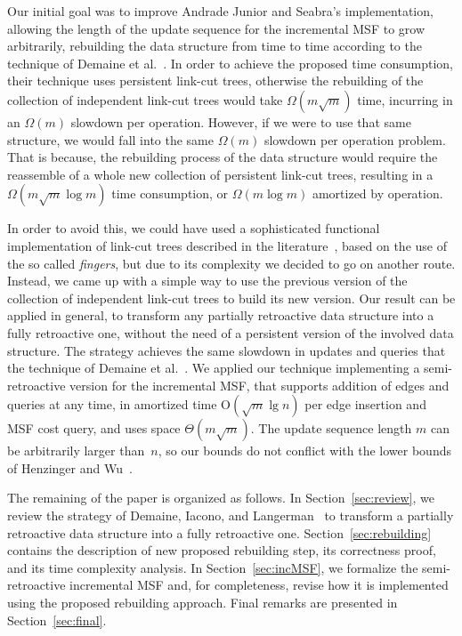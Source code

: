 \documentclass[reqno,11pt]{amsart}
\newcommand{\Oh}{\mathrm{O}}
\begin{document}
Our initial goal was to improve Andrade Junior and Seabra's implementation, allowing the length 
of the update sequence for the incremental MSF to grow arbitrarily, 
rebuilding the data structure from time to time according to the technique 
of Demaine et al.~\cite{DemaineIL2007}. In order to achieve the proposed time 
consumption, their technique uses persistent link-cut trees, otherwise the 
rebuilding of the collection of independent link-cut trees would take 
$\Omega(m \sqrt{m})$ time, incurring in an $\Omega(m)$ slowdown per operation.
However, if we were to use that same structure, we would fall into the same $\Omega(m)$
slowdown per operation problem. That is because, the rebuilding process of the data structure
would require the reassemble of a whole new collection of persistent link-cut trees, resulting 
in a $\Omega(m \sqrt{m} \log{m})$ time consumption, or $\Omega(m \log{m})$ amortized by operation.

In order to avoid this, we could have used a sophisticated functional implementation of link-cut 
trees described in  the literature~\cite{DemaineLP2008}, based on the use of the so called \emph{fingers},
but due to its complexity we decided to go on another route. Instead, we came up with a simple way to use 
the previous version of the collection of independent link-cut trees to 
build its new version.  Our result can be applied in general, to transform 
any partially retroactive data structure into a fully retroactive one, 
without the need of a persistent version of the involved data structure.  
The strategy achieves the same slowdown in updates and queries that the 
technique of Demaine et al.~\cite{DemaineIL2007}.  We applied our technique 
implementing a semi-retroactive version for the incremental MSF, that supports 
addition of edges and queries at any time, in amortized time $\Oh(\sqrt{m}\lg n)$ 
per edge insertion and MSF cost query, and uses space $\Theta(m\sqrt{m})$.  
The update sequence length $m$ can be arbitrarily larger than~$n$, 
so our bounds do not conflict with the lower bounds of Henzinger and Wu~\cite{HenzingerW2021}.

The remaining of the paper is organized as follows. 
In Section~\ref{sec:review}, we review the strategy of Demaine, Iacono, and 
Langerman~\cite{DemaineIL2007} to transform a partially retroactive data structure 
into a fully retroactive one.
Section~\ref{sec:rebuilding} contains the description of new proposed rebuilding step, 
its correctness proof, and its time complexity analysis. 
In Section~\ref{sec:incMSF}, we formalize the semi-retroactive incremental MSF
and, for completeness, revise how it is implemented using the proposed rebuilding approach. 
Final remarks are presented in Section~\ref{sec:final}.
\end{document}
